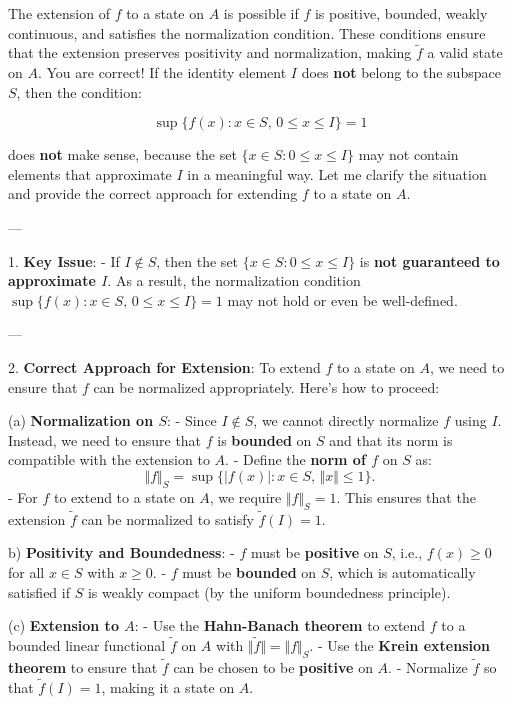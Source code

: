 \documentclass{article}
\begin{document}
The extension of $f $ to a state on $A $ is possible if $f $ is positive,
bounded, weakly continuous, and satisfies the normalization condition. These
conditions ensure that the extension preserves positivity and normalization,
making $\tilde{f} $ a valid state on $A $. You are correct! If the identity
element $I $ does \textbf{not} belong to the subspace $S $, then the
condition:

\begin{equation*}
\sup \{ f(x) : x \in S, \, 0 \leq x \leq I \} = 1 
\end{equation*}

does \textbf{not} make sense, because the set $\{ x \in S : 0 \leq x \leq I
\} $ may not contain elements that approximate $I $ in a meaningful way. Let
me clarify the situation and provide the correct approach for extending $f $
to a state on $A $.

---

1. \textbf{Key Issue}: - If $I\notin S$, then the set $\{x\in S:0\leq x\leq
I\}$ is \textbf{not guaranteed to approximate $I$}. As a result, the
normalization condition $\sup \{f(x):x\in S,\,0\leq x\leq I\}=1$ may not
hold or even be well-defined.

---

2. \textbf{Correct Approach for Extension}: To extend $f$ to a state on $A$,
we need to ensure that $f$ can be normalized appropriately. Here's how to
proceed:

(a) \textbf{Normalization on $S$}: - Since $I\notin S$, we cannot directly
normalize $f$ using $I$. Instead, we need to ensure that $f$ is \textbf{%
bounded} on $S$ and that its norm is compatible with the extension to $A$. -
Define the \textbf{norm of $f$} on $S$ as: 
\begin{equation*}
\Vert f\Vert _{S}=\sup \{|f(x)|:x\in S,\,\Vert x\Vert \leq 1\}.
\end{equation*}%
- For $f$ to extend to a state on $A$, we require $\Vert f\Vert _{S}=1$.
This ensures that the extension $\tilde{f}$ can be normalized to satisfy $%
\tilde{f}(I)=1$.

b) \textbf{Positivity and Boundedness}: - $f$ must be \textbf{positive} on $S
$, i.e., $f(x)\geq 0$ for all $x\in S$ with $x\geq 0$. - $f$ must be \textbf{%
bounded} on $S$, which is automatically satisfied if $S$ is weakly compact
(by the uniform boundedness principle).

(c) \textbf{Extension to $A$}: - Use the \textbf{Hahn-Banach theorem} to
extend $f$ to a bounded linear functional $\tilde{f}$ on $A$ with $\Vert 
\tilde{f}\Vert =\Vert f\Vert _{S}$. - Use the \textbf{Krein extension theorem%
} to ensure that $\tilde{f}$ can be chosen to be \textbf{positive} on $A$. -
Normalize $\tilde{f}$ so that $\tilde{f}(I)=1$, making it a state on $A$.
\end{document}
